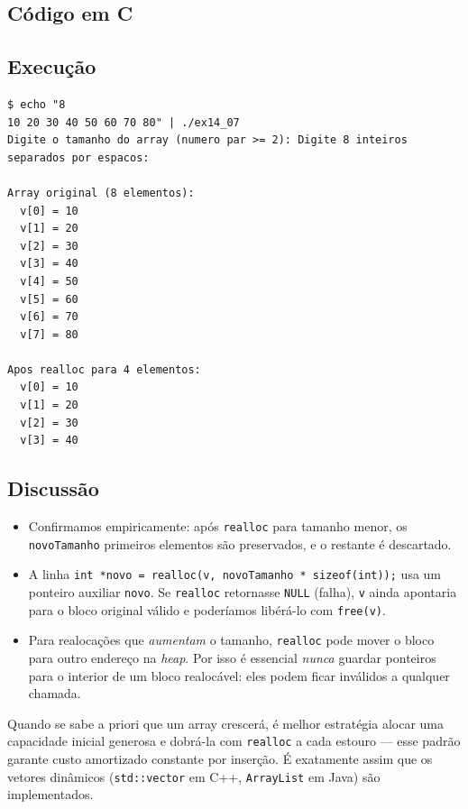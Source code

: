 \documentclass[11pt,a4paper]{article}
\begin{document}
\subsection*{C\'odigo em C}



\subsection*{Execu\c{c}\~ao}

\begin{saidabox}
\begin{lstlisting}[style=terminal]
$ echo "8
10 20 30 40 50 60 70 80" | ./ex14_07
Digite o tamanho do array (numero par >= 2): Digite 8 inteiros separados por espacos:

Array original (8 elementos):
  v[0] = 10
  v[1] = 20
  v[2] = 30
  v[3] = 40
  v[4] = 50
  v[5] = 60
  v[6] = 70
  v[7] = 80

Apos realloc para 4 elementos:
  v[0] = 10
  v[1] = 20
  v[2] = 30
  v[3] = 40
\end{lstlisting}
\end{saidabox}

\subsection*{Discuss\~ao}

\begin{itemize}[leftmargin=*]
  \item Confirmamos empiricamente: ap\'os \texttt{realloc} para tamanho menor, os \texttt{novoTamanho} primeiros elementos s\~ao preservados, e o restante \'e descartado.
  \item A linha \texttt{int *novo = realloc(v, novoTamanho * sizeof(int));} usa um ponteiro auxiliar \texttt{novo}. Se \texttt{realloc} retornasse \texttt{NULL} (falha), \texttt{v} ainda apontaria para o bloco original v\'alido e poder\'iamos lib\'er\'a-lo com \texttt{free(v)}.
  \item Para realoca\c{c}\~oes que \emph{aumentam} o tamanho, \texttt{realloc} pode mover o bloco para outro endere\c{c}o na \emph{heap}. Por isso \'e essencial \emph{nunca} guardar ponteiros para o interior de um bloco realoc\'avel: eles podem ficar inv\'alidos a qualquer chamada.
\end{itemize}

\begin{dicadesemp}
Quando se sabe a priori que um array crescer\'a, \'e melhor estrat\'egia alocar uma capacidade inicial generosa e dobr\'a-la com \texttt{realloc} a cada estouro --- esse padr\~ao garante custo amortizado constante por inser\c{c}\~ao. \'E exatamente assim que os vetores din\^amicos (\texttt{std::vector} em C++, \texttt{ArrayList} em Java) s\~ao implementados.
\end{dicadesemp}
\end{document}
